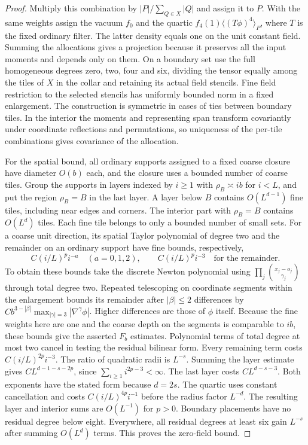 \documentclass[11pt]{article}
\theoremstyle{definition}
\begin{document}
\begin{proof}
Multiply this combination by \(|P|/\sum_{Q\in X}|Q|\)
and assign it to \(P\). With the same weights assign the
vacuum \(f_0\) and the quartic
\(f_4(1)\langle (T\phi)^4\rangle_P\), where \(T\) is the fixed
ordinary filter. The latter density equals one on the unit
constant field. Summing the allocations gives a projection
because it preserves all the input moments and depends only on
them. On a boundary set use the full homogeneous degrees
zero, two, four and six, dividing the tensor equally among
the tiles of \(X\) in the collar and retaining its actual
field stencils. Fine field restriction to the selected stencils
has uniformly bounded norm in a fixed enlargement. The
construction is symmetric in cases of ties between boundary
tiles. In the interior the moments and representing span
transform covariantly under coordinate reflections and
permutations, so uniqueness of the per-tile combinations
gives covariance of the allocation.

For the spatial bound, all ordinary supports assigned to a
fixed coarse closure have diameter \(O(b)\) each, and the
closure uses a bounded number of coarse tiles. Group the
supports in layers indexed by \(i\ge1\) with
\(\rho_B\asymp ib\) for \(i<L\), and put the region
\(\rho_B=B\) in the last layer. A layer below \(B\) contains
\(O(L^{d-1})\) fine tiles, including near edges and corners.
The interior part with \(\rho_B=B\) contains \(O(L^d)\)
tiles. Each fine tile belongs to only a bounded number of
small sets. For a coarse unit direction, its spatial Taylor
polynomial of degree two and the remainder on an ordinary
support have fine bounds, respectively,
\begin{equation}
 C(i/L)^p i^{-a}\quad(a=0,1,2),\qquad
 C(i/L)^p i^{-3}\quad\text{for the remainder}.
\end{equation}
To obtain these bounds take the discrete Newton polynomial
using \(\prod_j\binom{x_j-o_j}{\gamma_j}\) through total degree
two. Repeated telescoping on coordinate segments within the
enlargement bounds its remainder after \(|\beta|\le2\) differences
by \(C b^{3-|\beta|}\max_{|\gamma|=3}|\nabla^\gamma\phi|\).
Higher differences are those of \(\phi\) itself. Because the
fine weights here are one and the coarse depth on the segments
is comparable to \(ib\), these bounds give the asserted
\(F_b\) estimates. Polynomial terms of total degree at most
two cancel in testing the residual bilinear form. Every
remaining term costs \(C(i/L)^{2p} i^{-3}\).
The ratio of quadratic radii is \(L^{-s}\). Summing the
layer estimate gives \(C L^{d-1-s-2p}\), since
\(\sum_{i\ge1}i^{2p-3}<\infty\). The last layer costs
\(C L^{d-s-3}\). Both exponents have the stated form because
\(d=2s\). The quartic uses constant cancellation and costs
\(C(i/L)^{4p} i^{-1}\) before the radius factor \(L^{-d}\).
The resulting layer and interior sums are \(O(L^{-1})\)
for \(p>0\). Boundary placements have no residual degree
below eight. Everywhere, all residual degrees at least
six gain \(L^{-s}\) after summing \(O(L^d)\) terms.
This proves the zero-field bound.


\end{proof}
\end{document}
